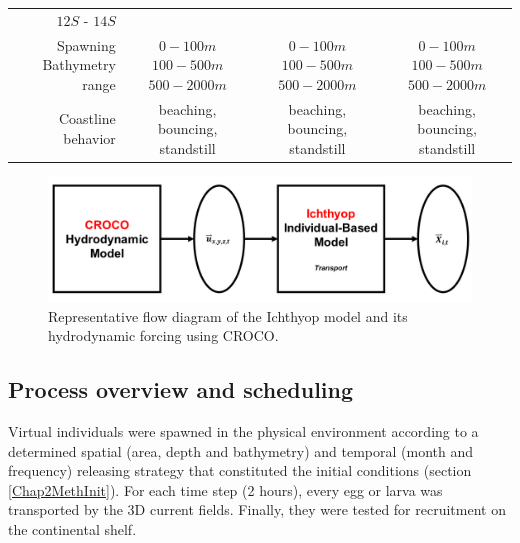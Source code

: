 \begin{table}[H]
\begin{tabular}{r|c|c|c}
{		  $12$\textdegree $S$ - $14$\textdegree $S$}		\\
Spawning Bathymetry range									&
\makecell{$0-100 m$ \\ $100-500 m$ \\ $500-2000 m$}	&
\makecell{$0-100 m$ \\ $100-500 m$ \\ $500-2000 m$}	&
\makecell{$0-100 m$ \\ $100-500 m$ \\ $500-2000 m$}	\\
Coastline behavior								&
\makecell{beaching,\\bouncing,\\standstill}	&
\makecell{beaching,\\bouncing,\\standstill}	&
\makecell{beaching,\\bouncing,\\standstill}	\\
    \bottomrule
    \end{tabular}
    \label{Chap2TabSimus}
\end{table}

\begin{figure}[H]
	\includegraphics[width=1.0\textwidth]{figures/Chap2Ichthyop.png}
	\centering
	\caption{Representative flow diagram of the Ichthyop model and its hydrodynamic forcing using CROCO.}
	\label{Chap2Ichthyop}
\end{figure}

\subsection{Process overview and scheduling}\label{Chap2MethProc}

Virtual individuals were spawned in the physical environment according to a determined spatial (area, depth and bathymetry) and temporal (month and frequency) releasing strategy that constituted the initial conditions (section \ref{Chap2MethInit}). For each time step (2 hours), every egg or larva was transported by the 3D current fields. Finally, they were tested for recruitment on the continental shelf.\\

